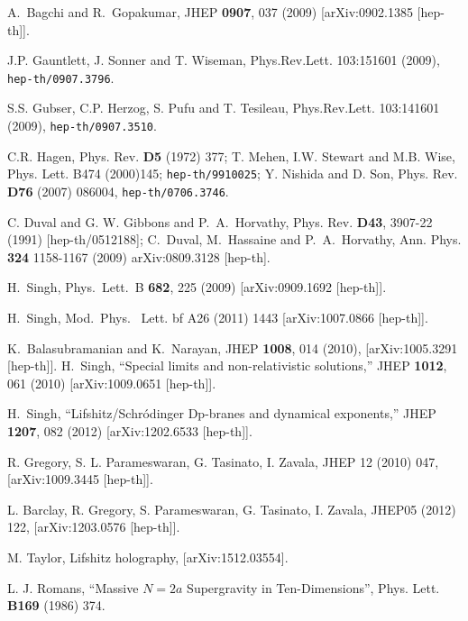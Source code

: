 \documentclass[12pt]{article}
\newcommand{\hepth}[1]{{\tt hep-th/{#1}}}
\begin{document}
\begin{thebibliography}{99}
  A.~Bagchi and R.~Gopakumar,
  JHEP {\bf 0907}, 037 (2009)
  [arXiv:0902.1385 [hep-th]].

 J.P. Gauntlett, J. Sonner and T. Wiseman, 
Phys.Rev.Lett. 103:151601 (2009), \hepth{0907.3796}.

 S.S. Gubser, C.P. Herzog, S. Pufu and T. Tesileau, 
Phys.Rev.Lett. 103:141601 (2009), \hepth{0907.3510}.

 C.R. Hagen, Phys. Rev. {\bf D5} (1972) 377; T. Mehen, I.W. 
Stewart and M.B. Wise, Phys. Lett. B474 (2000)145; 
\hepth{9910025};
Y. Nishida and D. Son, Phys. Rev. {\bf D76} (2007) 086004, 
\hepth{0706.3746}.

C. Duval and G. W. Gibbons and P.~A.~Horvathy,
Phys. Rev. {\bf D43}, 3907-22  (1991)
[hep-th/0512188];
C.~Duval, M.~Hassaine and P.~A.~Horvathy,
Ann. Phys. {\bf 324} 1158-1167 (2009)
arXiv:0809.3128 [hep-th].


  H.~Singh,
  Phys.\ Lett.\ B {\bf 682}, 225 (2009)
  [arXiv:0909.1692 [hep-th]].

  H.~Singh,
 Mod.\ Phys. \ Lett. {bf A26} (2011) 1443
  [arXiv:1007.0866 [hep-th]].

  K.~Balasubramanian and K.~Narayan,
  JHEP {\bf 1008}, 014 (2010),
  [arXiv:1005.3291 [hep-th]].
  H.~Singh,
  ``Special limits and non-relativistic solutions,''
  JHEP {\bf 1012}, 061 (2010)
  [arXiv:1009.0651 [hep-th]].

  H.~Singh,
  ``Lifshitz/Schr\'odinger Dp-branes and dynamical exponents,''
  JHEP {\bf 1207}, 082 (2012)
  [arXiv:1202.6533 [hep-th]].

R. Gregory, S. L. Parameswaran, G. Tasinato, I. Zavala,
JHEP 12 (2010) 047,  [arXiv:1009.3445 [hep-th]].

L. Barclay, R. Gregory, S. Parameswaran, G. Tasinato, I. Zavala, 
JHEP05 (2012) 122,  [arXiv:1203.0576 [hep-th]]. 


    M. Taylor, 
    Lifshitz holography,  [arXiv:1512.03554].



 L. J. Romans, 
``Massive $N=2a$ Supergravity in Ten-Dimensions'', 
Phys. Lett. {\bf B169} (1986) 374.


\end{thebibliography}
\end{document}
